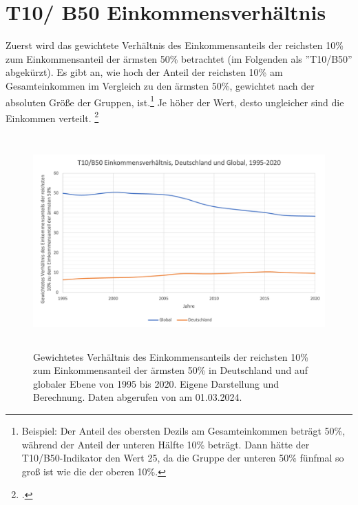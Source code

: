 \section{T10/ B50 Einkommensverhältnis}

Zuerst wird das gewichtete Verhältnis des Einkommensanteils der reichsten 10\% zum Einkommensanteil der ärmsten 50\% betrachtet (im Folgenden als ''T10/B50'' abgekürzt). Es gibt an, wie hoch der Anteil der reichsten 10\% am Gesamteinkommen im Vergleich zu den ärmsten 50\%, gewichtet nach der absoluten Grö{\ss}e der Gruppen, ist.\footnote{Beispiel: Der Anteil des obersten Dezils am Gesamteinkommen beträgt 50\%, während der Anteil der unteren Hälfte 10\% beträgt. Dann hätte der T10/B50-Indikator den Wert 25, da die Gruppe der unteren 50\% fünfmal so gro{\ss} ist wie die der oberen 10\%.} Je höher der Wert, desto ungleicher sind die Einkommen verteilt. \footcite[Vgl.][S. 31]{wir_2022} 

\begin{figure}[h]
    \centering
    \includegraphics[height=8.15cm]{Bilder/T10B50-Ratio3.png}
    \caption[T10/B50 Einkommensverhältnis, Deutschland und global, 1995-2020]{Gewichtetes Verhältnis des Einkommensanteils der reichsten 10\% zum Einkommensanteil der ärmsten 50\% in Deutschland und auf globaler Ebene von 1995 bis 2020. Eigene Darstellung und Berechnung. Daten abgerufen von \cite[][, S.55, 195]{wir_2022} am 01.03.2024.}
    \label{fig:iso_norm}
\end{figure}

